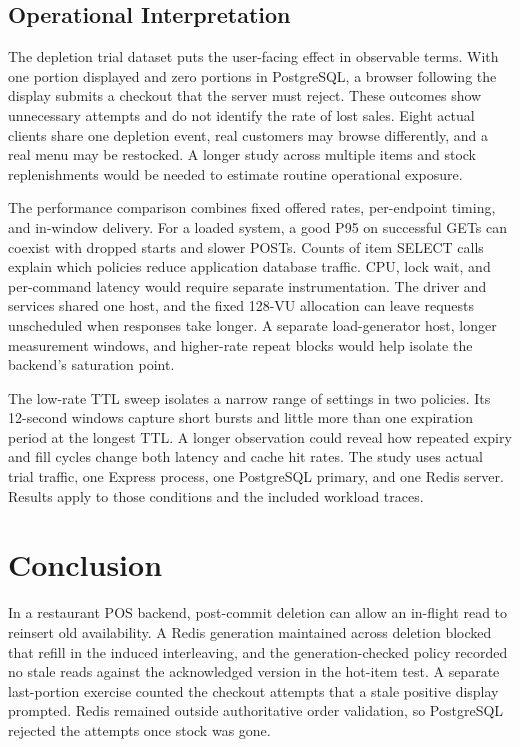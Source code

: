 \documentclass[conference]{IEEEtran}
\begin{document}
\subsection{Operational Interpretation}

The depletion trial dataset puts the user-facing effect in observable terms. With one portion displayed and zero portions in PostgreSQL, a browser following the display submits a checkout that the server must reject. These outcomes show unnecessary attempts and do not identify the rate of lost sales. Eight actual clients share one depletion event, real customers may browse differently, and a real menu may be restocked. A longer study across multiple items and stock replenishments would be needed to estimate routine operational exposure.

The performance comparison combines fixed offered rates, per-endpoint timing, and in-window delivery. For a loaded system, a good P95 on successful GETs can coexist with dropped starts and slower POSTs. Counts of item SELECT calls explain which policies reduce application database traffic. CPU, lock wait, and per-command latency would require separate instrumentation. The driver and services shared one host, and the fixed 128-VU allocation can leave requests unscheduled when responses take longer. A separate load-generator host, longer measurement windows, and higher-rate repeat blocks would help isolate the backend's saturation point.

The low-rate TTL sweep isolates a narrow range of settings in two policies. Its 12-second windows capture short bursts and little more than one expiration period at the longest TTL. A longer observation could reveal how repeated expiry and fill cycles change both latency and cache hit rates. The study uses actual trial traffic, one Express process, one PostgreSQL primary, and one Redis server. Results apply to those conditions and the included workload traces.

\section{Conclusion}

In a restaurant POS backend, post-commit deletion can allow an in-flight read to reinsert old availability. A Redis generation maintained across deletion blocked that refill in the induced interleaving, and the generation-checked policy recorded no stale reads against the acknowledged version in the hot-item test. A separate last-portion exercise counted the checkout attempts that a stale positive display prompted. Redis remained outside authoritative order validation, so PostgreSQL rejected the attempts once stock was gone.
\end{document}
